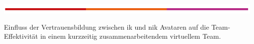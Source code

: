 \documentclass[a4paper,11pt]{article}%
\renewcommand{\\}{\vspace*{0.5\baselineskip} \newline}
\begin{document}
	\begin{titlepage}
		\begin{flushleft}
			\vspace*{-1cm}
			\includegraphics[scale=1]{Abbildungen/TH.png}\\
			\vspace*{1cm}
		\end{flushleft}
		
		\begin{huge}
			\noindent
			
			
			

%
%


Einfluss der Vertrauensbildung zwischen \ac{ik} und \ac{nik} Avataren auf die Team-Effektivität in einem kurzzeitig zusammenarbeitendem virtuellem Team.\\
		\end{huge}
		

\end{titlepage}
\end{document}
